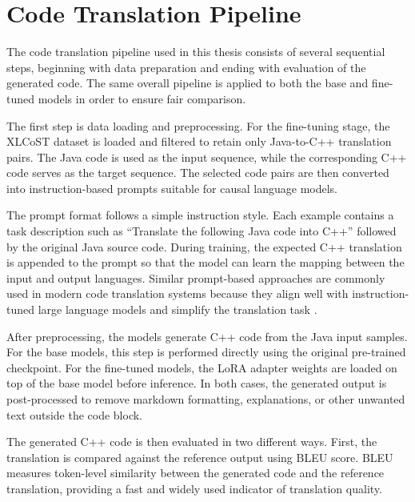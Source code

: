 \section{Code Translation Pipeline}

The code translation pipeline used in this thesis consists of several sequential
steps, beginning with data preparation and ending with evaluation of the
generated code. The same overall pipeline is applied to both the base and
fine-tuned models in order to ensure fair comparison.

The first step is data loading and preprocessing. For the fine-tuning stage, the
XLCoST dataset is loaded and filtered to retain only Java-to-C++ translation
pairs. The Java code is used as the input sequence, while the corresponding C++
code serves as the target sequence. The selected code pairs are then converted
into instruction-based prompts suitable for causal language models.

The prompt format follows a simple instruction style. Each example contains a
task description such as ``Translate the following Java code into C++'' followed
by the original Java source code. During training, the expected C++ translation
is appended to the prompt so that the model can learn the mapping between the
input and output languages. Similar prompt-based approaches are commonly used in
modern code translation systems because they align well with instruction-tuned
large language models and simplify the translation task
\cite{aljagthami2025prompt, qwen_coder}.

After preprocessing, the models generate C++ code from the Java input samples.
For the base models, this step is performed directly using the original
pre-trained checkpoint. For the fine-tuned models, the LoRA adapter weights are
loaded on top of the base model before inference. In both cases, the generated
output is post-processed to remove markdown formatting, explanations, or other
unwanted text outside the code block.

The generated C++ code is then evaluated in two different ways. First, the
translation is compared against the reference output using BLEU score. BLEU
measures token-level similarity between the generated code and the reference
translation, providing a fast and widely used indicator of translation quality.


